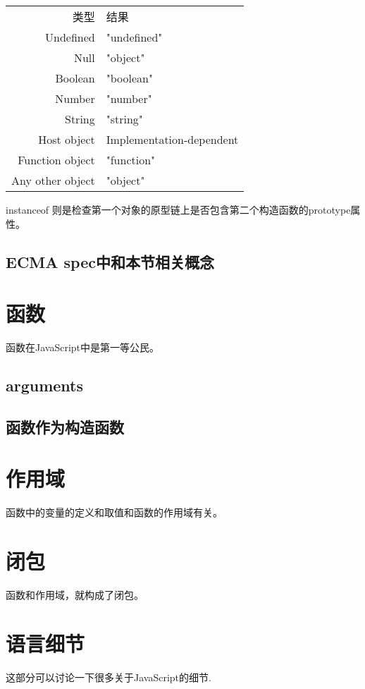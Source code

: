 	\begin{tabular}{rl}
		类型	& 	结果\\[5pt]
		Undefined 	& 	"undefined"\\
		Null		&	"object"\\
		Boolean		&	"boolean"\\
		Number		&	"number"\\
		String		&	"string"\\
		Host object & Implementation-dependent\\
		Function object & "function"\\
		Any other object &	"object"\\
	\end{tabular}

	instanceof 则是检查第一个对象的原型链上是否包含第二个构造函数的prototype属性。

	
	\subsection{ECMA spec中和本节相关概念}

	\section{函数}
	函数在JavaScript中是第一等公民。

	
	\subsection{arguments}
	\subsection{函数作为构造函数}	
	
	\section{作用域}
	函数中的变量的定义和取值和函数的作用域有关。
	\section{闭包}
	函数和作用域，就构成了闭包。
	\section{语言细节}
	这部分可以讨论一下很多关于JavaScript的细节.
